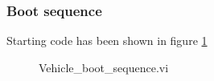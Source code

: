 \subsubsection{Boot sequence}
Starting code has been shown in figure \ref{vi:boot_sequence}
\begin{figure}[H]
    \centering
    \renewcommand{\thesubfigure}{}%
    \tightsubcaptions %
    \setlength{\subfloatlabelskip}{0pt}%
\end{figure}
\begin{figure}[H]\ContinuedFloat
    \centering
    \renewcommand{\thesubfigure}{}%
    \tightsubcaptions %
    \setlength{\subfloatlabelskip}{0pt}%
\end{figure}
\begin{figure}[H]\ContinuedFloat
    \centering
    \renewcommand{\thesubfigure}{}%
    \tightsubcaptions %
    \setlength{\subfloatlabelskip}{0pt}%
    \caption{Vehicle\_boot\_sequence.vi}
    \label{vi:boot_sequence}
\end{figure}
